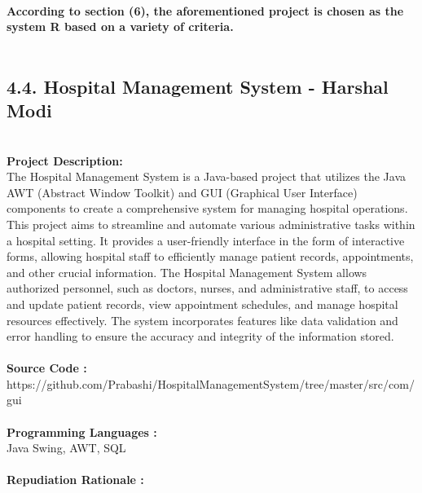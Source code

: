 \documentclass[12pt,letterpaper]{report}
\begin{document}
\\
\normalsize{\textbf{According to section (6), the aforementioned project is chosen as the system R based on a variety of criteria. }}\\
    
\\

\subsection*{4.4. Hospital Management System - Harshal Modi } \\
\normalsize {\textbf{Project Description:}} \\
\normalsize {The Hospital Management System is a Java-based project that utilizes the Java AWT (Abstract Window Toolkit) and GUI (Graphical User Interface) components to create a comprehensive system for managing hospital operations. This project aims to streamline and automate various administrative tasks within a hospital setting. It provides a user-friendly interface in the form of interactive forms, allowing hospital staff to efficiently manage patient records, appointments, and other crucial information. The Hospital Management System allows authorized personnel, such as doctors, nurses, and administrative staff, to access and update patient records, view appointment schedules, and manage hospital resources effectively. The system incorporates features like data validation and error handling to ensure the accuracy and integrity of the information stored.}\\
\\
\normalsize{\textbf{Source Code :}} \\
\normalsize{https://github.com/Prabashi/HospitalManagementSystem/tree/master/src/com/gui}\\
\\
\normalsize{\textbf{Programming Languages :}}\\
\normalsize{Java Swing, AWT, SQL}\\
\\
\normalsize{\textbf{Repudiation Rationale : }}\\
\end{document}
